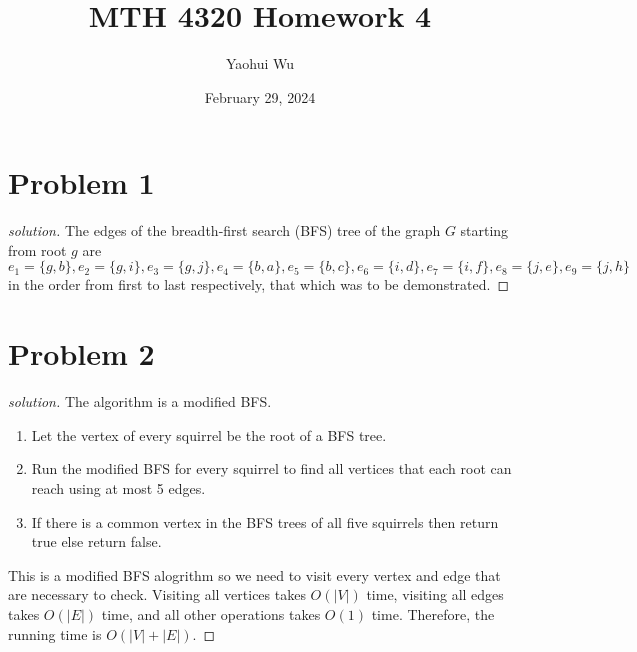 \documentclass[12pt]{article}
\title{MTH 4320 Homework 4}
\author{Yaohui Wu}
\date{February 29, 2024}
\newenvironment*{solution}{\begin{proof}[solution]}{\end{proof}}
\begin{document}
\maketitle
\section*{Problem 1}
\begin{solution}
    The edges of the breadth-first search (BFS) tree of the graph \(G\)
    starting from root \(g\) are \(e_1=\{g,b\},e_2=\{g,i\},e_3=\{g,j\},e_4=\{
        b,a\},e_5=\{b,c\},e_6=\{i,d\},e_7=\{i,f\},e_8=\{j,e\},e_9=\{j,h\}\) in
        the order from first to last respectively, that which was to be
        demonstrated.
\end{solution}
\section*{Problem 2}
\begin{solution}
    The algorithm is a modified BFS.
    \begin{enumerate}
        \item Let the vertex of every squirrel be the root of a BFS tree.
        \item Run the modified BFS  for every squirrel to find all vertices
        that each root can reach using at most 5 edges.
        \item If there is a common vertex in the BFS trees of all five
        squirrels then return true else return false.
    \end{enumerate}
    This is a modified BFS alogrithm so we need to visit every vertex and edge
    that are necessary to check. Visiting all vertices takes \(O(|V|)\) time,
    visiting all edges takes \(O(|E|)\) time, and all other operations takes
    \(O(1)\) time. Therefore, the running time is \(O(|V|+|E|)\).
\end{solution}
\end{document}
